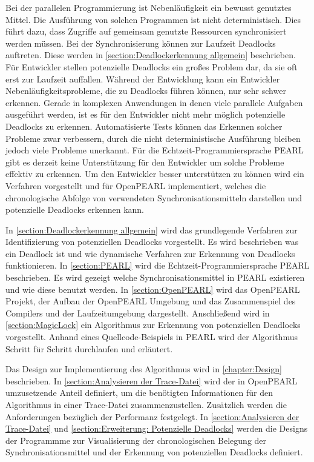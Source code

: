 Bei der parallelen Programmierung ist Nebenläufigkeit ein bewusst genutztes
Mittel. Die Ausführung von solchen Programmen ist nicht deterministisch. Dies
führt dazu, dass Zugriffe auf gemeinsam genutzte Ressourcen synchronisiert
werden müssen. Bei der Synchronisierung können zur Laufzeit Deadlocks auftreten.
Diese werden in \cref{section:Deadlockerkennung allgemein} beschrieben. Für
Entwickler stellen potenzielle Deadlocks ein großes Problem dar, da sie oft erst
zur Laufzeit auffallen. Während der Entwicklung kann ein Entwickler
Nebenläufigkeitsprobleme, die zu Deadlocks führen können, nur sehr schwer
erkennen. Gerade in komplexen Anwendungen in denen viele parallele Aufgaben
ausgeführt werden, ist es für den Entwickler nicht mehr möglich potenzielle
Deadlocks zu erkennen. Automatisierte Tests können das Erkennen solcher Probleme
zwar verbessern, durch die nicht deterministische Ausführung bleiben jedoch
viele Probleme unerkannt. Für die Echtzeit-Programmiersprache PEARL gibt es
derzeit keine Unterstützung für den Entwickler um solche Probleme effektiv zu
erkennen. Um den Entwickler besser unterstützen zu können wird ein Verfahren
vorgestellt und für OpenPEARL implementiert, welches die chronologische Abfolge
von verwendeten Synchronisationsmitteln darstellen und potenzielle Deadlocks
erkennen kann. 

In \cref{section:Deadlockerkennung allgemein} wird das grundlegende Verfahren
zur Identifizierung von potenziellen Deadlocks vorgestellt. Es wird beschrieben
was ein Deadlock ist und wie dynamische Verfahren zur Erkennung von Deadlocks
funktionieren. In \cref{section:PEARL} wird die Echtzeit-Programmiersprache
PEARL beschrieben. Es wird gezeigt welche Synchronisationsmittel in PEARL
existieren und wie diese benutzt werden. In \cref{section:OpenPEARL} wird das
OpenPEARL Projekt, der Aufbau der OpenPEARL Umgebung und das Zusammenspiel des
Compilers und der Laufzeitumgebung dargestellt. Anschließend wird in
\cref{section:MagicLock} ein Algorithmus zur Erkennung von potenziellen
Deadlocks vorgestellt. Anhand eines Quellcode-Beispiels in PEARL wird der
Algorithmus Schritt für Schritt durchlaufen und erläutert. 

Das Design zur Implementierung des Algorithmus wird in \cref{chapter:Design}
beschrieben. In \cref{section:Analysieren der Trace-Datei} wird der in OpenPEARL
umzusetzende Anteil definiert, um die benötigten Informationen für den
Algorithmus in einer Trace-Datei zusammenzustellen. Zusätzlich werden die
Anforderungen bezüglich der Performanz festgelegt. In \cref{section:Analysieren
der Trace-Datei} und \cref{section:Erweiterung: Potenzielle Deadlocks} werden
die Designs der Programmme zur Visualisierung der chronologischen Belegung der
Synchronisationsmittel und der Erkennung von potenziellen Deadlocks definiert.


